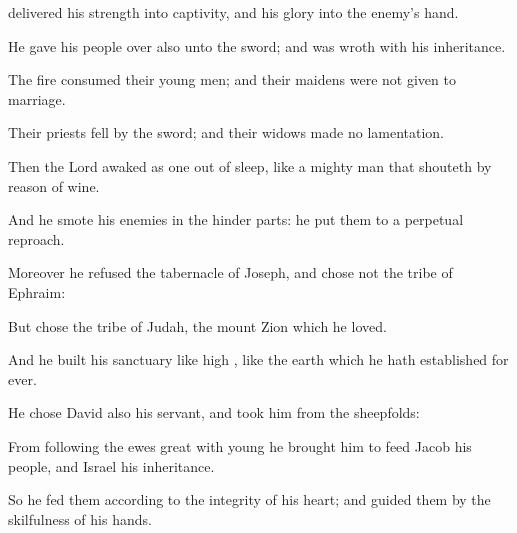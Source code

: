 {delivered his
strength into
captivity, and his
glory into the
enemy’s
hand.
\par }{\Q {}He
gave his
people
over also unto the
sword; and was
wroth with his
inheritance.
\par }{\Q {}The
fire
consumed their young
men; and their
maidens were not given to
marriage.
\par }{\Q {}Their
priests
fell by the
sword; and their
widows made no
lamentation.
\par }{\Q {}Then the
Lord
awaked as one out of
sleep,
{} like a mighty
man that
shouteth by reason of
wine.
\par }{\Q {}And he
smote his
enemies in the hinder
parts: he
put them to a
perpetual
reproach.
\par }{\Q {}Moreover he
refused the
tabernacle of
Joseph, and
chose not the
tribe of
Ephraim:
\par }{\Q {}But
chose the
tribe of
Judah, the
mount
Zion which he
loved.
\par }{\Q {}And he
built his
sanctuary like
high
{}, like the
earth which he hath
established for
ever.
\par }{\Q {}He
chose
David also his
servant, and
took him from the
sheepfolds:
\par }{\Q {}From
following the ewes great with
young he
brought him to
feed
Jacob his
people, and
Israel his
inheritance.
\par }{\Q {}So he
fed them according to the
integrity of his
heart; and
guided them by the
skilfulness of his
hands.

}
